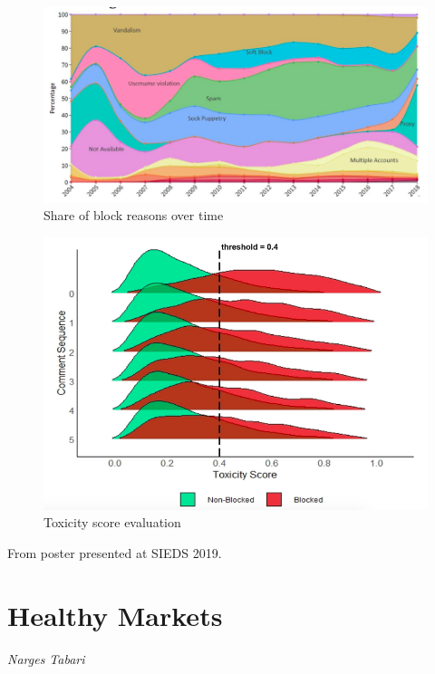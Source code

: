 \begin{figure}[!hbtp]
\includegraphics[width=\textwidth]{images/wiki1}
\caption[Wikipedia user blocking summary]{Share of block reasons over time}
\end{figure}

\begin{figure}[!hbtp]
\includegraphics[width=\textwidth]{images/wiki2}
\caption{Toxicity score evaluation}
\end{figure}

From poster presented at SIEDS 2019.

\pagebreak
\section{Healthy Markets}
\label{sec:hmt}

\emph{Narges Tabari}
\bigskip

